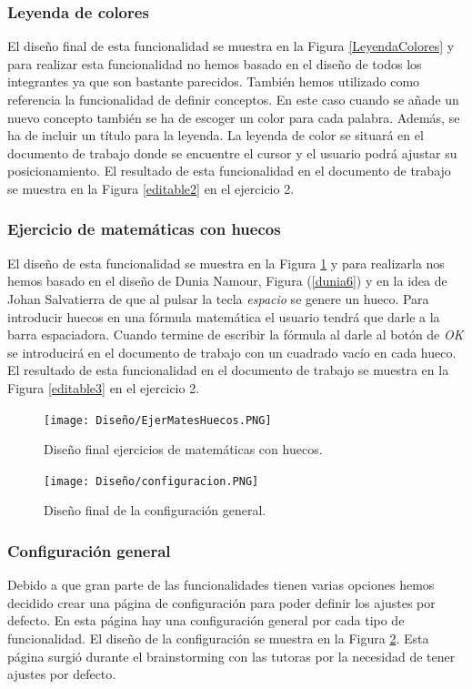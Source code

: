 \subsubsection{Leyenda de colores}
El diseño final de esta funcionalidad se muestra en la Figura \ref{LeyendaColores} y para realizar esta funcionalidad no hemos basado en el diseño de todos los integrantes ya que son bastante parecidos. También hemos utilizado como referencia la funcionalidad de definir conceptos. En este caso cuando se añade un nuevo concepto también se ha de escoger un color para cada palabra. Además, se ha de incluir un título para la leyenda. La leyenda de color se situará en el documento de trabajo donde se encuentre el cursor y el usuario podrá ajustar su posicionamiento. El resultado de esta funcionalidad en el documento de trabajo se muestra en la Figura \ref{editable2} en el ejercicio 2.


\subsubsection{Ejercicio de matemáticas con huecos}
El diseño de esta funcionalidad se muestra en la Figura \ref{matesHueco} y para realizarla nos hemos basado en el diseño de Dunia Namour, Figura (\ref{dunia6}) y en la idea de Johan Salvatierra de que al pulsar la tecla \textit{espacio} se genere un hueco. Para introducir huecos en una fórmula matemática el usuario tendrá que darle a la barra espaciadora. Cuando termine de escribir la fórmula al darle al botón de \textit{OK} se introducirá en el documento de trabajo con un cuadrado vacío en cada hueco. El resultado de esta funcionalidad en el documento de trabajo se muestra en la Figura \ref{editable3} en el ejercicio 2.

\begin{figure}[ht!]
  \centering
  \texttt{[image: Diseño/EjerMatesHuecos.PNG]}
  \caption{Diseño final ejercicios de matemáticas con huecos.}
  \label{matesHueco}
\end{figure}
\begin{figure}[ht!]
  \centering
  \texttt{[image: Diseño/configuracion.PNG]}
  \caption{Diseño final de la configuración general.}
  \label{configu}
\end{figure}
\subsubsection{Configuración general}
Debido a que gran parte de las funcionalidades tienen varias opciones hemos decidido crear una página de configuración para poder definir los ajustes por defecto. En esta página hay una configuración general por cada tipo de funcionalidad. El diseño de la configuración se muestra en la Figura \ref{configu}. Esta página surgió durante el brainstorming con las tutoras por la necesidad de tener ajustes por defecto.



